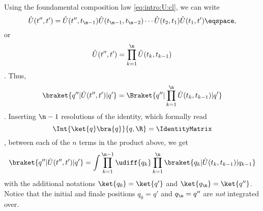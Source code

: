 Using  the foundamental
composition law \cref{eq:intro:U:cl}, we can write
\begin{dmath*}
\hat{U}(t'', t') = \hat{U}(t'', t_{\n-1}) \hat{U}(t_{\n-1}, t_{\n-2}) \cdots
\hat{U}(t_{2}, t_{1} ) \hat{U}(t_{1}, t') \eqspace ,
\end{dmath*}
or
\begin{dmath*}
\hat{U}(t'', t') = \prod_{k=1}^{\n} \hat{U} (t_{k}, t_{k-1}) 
\end{dmath*}.
Thus,
\begin{dmath*}
\braket{q''|\hat{U}(t'',t')|q'} = \Braket{q'' | \prod_{k=1}^{\n} \hat{U}(t_{k},
t_{k-1})| q'}  
\end{dmath*}.
Inserting $\n-1$ resolutions of the identity, which formally read
\begin{dmath*}
\Int{\ket{q} \bra{q}}{q,\R} = \IdentityMatrix
\end{dmath*},
between each of the $n$ terms in the product above, we get
\begin{dmath}[label={Uprod}, frame]
\braket{q''|\hat{U}(t'',t')| q'}  =
\int \prod_{k=1}^{\n-1} \udiff{q_{k}}  \prod_{k=1}^{\n}  \braket{ q_{k}
| \hat{U}(t_{k} , t_{k-1})|q_{k-1}} 
\end{dmath}
with the additional notations $\ket{q_{0}} = \ket{q'} $ and $\ket{q_{\n}} =
\ket{q''}$.  Notice that the initial and finale positions $q_{0}=q'$ and
$q_{\n}=q''$ are \emph{not} integrated over.

